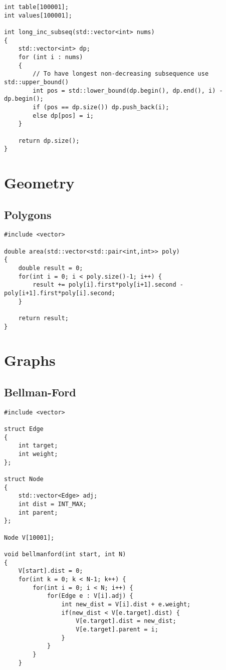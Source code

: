 \documentclass[10pt,a4paper,landscape,twosided]{extarticle}
\begin{document}
\begin{multicols}{2}
\begin{lstlisting}
int table[100001];
int values[100001];

int long_inc_subseq(std::vector<int> nums)
{
	std::vector<int> dp;
	for (int i : nums) 
    {
        // To have longest non-decreasing subsequence use std::upper_bound()
		int pos = std::lower_bound(dp.begin(), dp.end(), i) - dp.begin();
		if (pos == dp.size()) dp.push_back(i);
		else dp[pos] = i;
	}

	return dp.size();
}
\end{lstlisting}

\section{Geometry}

\subsection{Polygons}
\begin{lstlisting}
#include <vector>

double area(std::vector<std::pair<int,int>> poly) 
{
    double result = 0;
    for(int i = 0; i < poly.size()-1; i++) {
        result += poly[i].first*poly[i+1].second - poly[i+1].first*poly[i].second;
    }

    return result;
}
\end{lstlisting}

\section{Graphs}

\subsection{Bellman-Ford}
\begin{lstlisting}
#include <vector>

struct Edge
{
    int target;
    int weight;
};

struct Node
{
    std::vector<Edge> adj;
    int dist = INT_MAX;
    int parent;
};

Node V[10001];

void bellmanford(int start, int N)
{
    V[start].dist = 0;
    for(int k = 0; k < N-1; k++) {
        for(int i = 0; i < N; i++) {
            for(Edge e : V[i].adj) {
                int new_dist = V[i].dist + e.weight;
                if(new_dist < V[e.target].dist) {
                    V[e.target].dist = new_dist;
                    V[e.target].parent = i;
                }
            }
        }
    }


\end{lstlisting}
\end{multicols}
\end{document}
